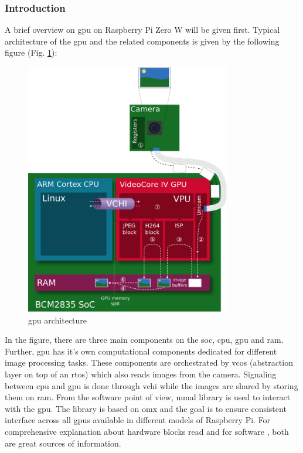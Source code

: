\subsubsection{Introduction}
A brief overview on \ac{gpu} on Raspberry Pi Zero W will be given first. Typical architecture of the \ac{gpu} and the related components is given by the following figure (Fig. \ref{fig:physical:gpu_architecture}):
 
 \begin{figure}[H]
    \centering
    \includegraphics[width=0.8\textwidth]{physical/figures/gpu_architecture}
    \caption{\ac{gpu} architecture \cite{noauthor_videocore_nodate-1}}
    \label{fig:physical:gpu_architecture}
\end{figure}

In the figure, there are three main components on the \ac{soc}, \ac{cpu}, \ac{gpu} and \ac{ram}. Further, \ac{gpu} has it's own computational components dedicated for different image processing tasks. These components are orchestrated by \ac{vcos} (abstraction layer on top of an \ac{rtos}) which also reads images from the camera. Signaling between \ac{cpu} and \ac{gpu} is done through \ac{vchi} while the images are shared by storing them on \ac{ram}. From the software point of view, \ac{mmal} library is used to interact with the \ac{gpu}. The library is based on \ac{omx} and the goal is to ensure consistent interface across all \acp{gpu} available in different models of Raspberry Pi. For comprehensive explanation about hardware blocks read \cite{noauthor_videocore_nodate-1} and for software \cite{noauthor_videocore_nodate}, both are great sources of information.


